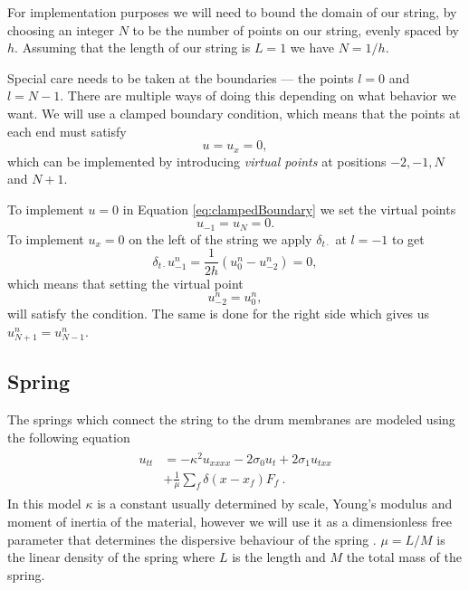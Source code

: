 \documentclass{article}
\begin{document}
For implementation purposes we will need to bound the domain of our string, by choosing an integer $N$ to be the number of points on our string, evenly spaced by $h$.
Assuming that the length of our string is $L = 1$ we have $N = 1 / h$.

Special care needs to be taken at the boundaries --- the points $l=0$ and $l=N-1$.
There are multiple ways of doing this depending on what behavior we want.
We will use a clamped boundary condition, which means that the points at each end must satisfy\cite[Chapter~7]{bilbao_numerical_2009}
\begin{equation}
\label{eq:clampedBoundary}
  u = u_x = 0,
\end{equation}
which can be implemented by introducing \textit{virtual points} at positions $-2, -1, N$ and $N+1$.

To implement $u = 0$ in Equation \eqref{eq:clampedBoundary} we set the virtual points
\begin{equation}
  u_{-1} = u_{N} = 0.
\end{equation}
To implement $u_x = 0$ on the left of the string we apply $\delta_{t\cdot}$ at $l = -1$ to get
\begin{equation}
  \delta_{t\cdot} u^n_{-1} = \frac{1}{2h}(u^n_0 - u^n_{-2}) = 0,
\end{equation}
which means that setting the virtual point
\begin{equation}
  u^n_{-2} = u^n_0,
\end{equation}
will satisfy the condition.
The same is done for the right side which gives us $u^n_{N+1} = u^n_{N-1}$.


\subsection{Spring}
\label{sec:spring}

The springs which connect the string to the drum membranes are modeled using the following equation\cite{parker_modeling_2010}
\begin{align}
  \begin{split}
  u_{tt} &= -\kappa^2 u_{xxxx}- 2 \sigma_0 u_t + 2 \sigma_1 u_{txx} \\
  & + \frac{1}{\mu}\sum_f\delta(x-x_f)F_f\ .
  \end{split}
  \label{eq:spring}
\end{align}
In this model $\kappa$ is a constant usually determined by scale, Young's modulus and moment of inertia of the material, however we will use it as a dimensionless free parameter that determines the dispersive behaviour of the spring \cite{bilbao_modular_2009}\cite{parker_modeling_2010}. $\mu = L / M$ is the linear density of the spring where $L$ is the length and $M$ the total mass of the spring.
\end{document}
